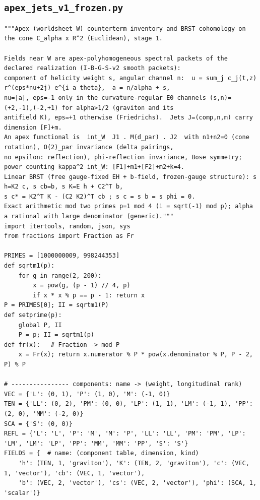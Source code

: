 \documentclass[10pt]{article}
\begin{document}
\subsection{\texttt{apex\_jets\_v1\_frozen.py}}
\begin{lstlisting}
"""Apex (worldsheet W) counterterm inventory and BRST cohomology on the cone C_alpha x R^2 (Euclidean), stage 1.

Fields near W are apex-polyhomogeneous spectral packets of the declared realization (I-B-G-S-v2 smooth packets):
component of helicity weight s, angular channel n:  u = sum_j c_j(t,z) r^(eps*nu+2j) e^{i a theta},  a = n/alpha + s,
nu=|a|, eps=-1 only in the curvature-regular E0 channels (s,n)=(+2,-1),(-2,+1) for alpha>1/2 (graviton and its
antifield K), eps=+1 otherwise (Friedrichs).  Jets J=(comp,n,m) carry dimension [F]+m.
An apex functional is  int_W  J1 . M(d_par) . J2  with n1+n2=0 (cone rotation), O(2)_par invariance (delta pairings,
no epsilon: reflection), phi-reflection invariance, Bose symmetry; power counting kappa^2 int_W: [F1]+m1+[F2]+m2+k=4.
Linear BRST (free gauge-fixed EH + b-field, frozen-gauge structure): s h=K2 c, s cb=b, s K=E h + C2^T b,
s c* = K2^T K - (C2 K2)^T cb ; s c = s b = s phi = 0.
Exact arithmetic mod two primes p=1 mod 4 (i = sqrt(-1) mod p); alpha a rational with large denominator (generic)."""
import itertools, random, json, sys
from fractions import Fraction as Fr

PRIMES = [1000000009, 998244353]
def sqrtm1(p):
    for g in range(2, 200):
        x = pow(g, (p - 1) // 4, p)
        if x * x % p == p - 1: return x
P = PRIMES[0]; II = sqrtm1(P)
def setprime(p):
    global P, II
    P = p; II = sqrtm1(p)
def fr(x):   # Fraction -> mod P
    x = Fr(x); return x.numerator % P * pow(x.denominator % P, P - 2, P) % P

# ---------------- components: name -> (weight, longitudinal rank)
VEC = {'L': (0, 1), 'P': (1, 0), 'M': (-1, 0)}
TEN = {'LL': (0, 2), 'PM': (0, 0), 'LP': (1, 1), 'LM': (-1, 1), 'PP': (2, 0), 'MM': (-2, 0)}
SCA = {'S': (0, 0)}
REFL = {'L': 'L', 'P': 'M', 'M': 'P', 'LL': 'LL', 'PM': 'PM', 'LP': 'LM', 'LM': 'LP', 'PP': 'MM', 'MM': 'PP', 'S': 'S'}
FIELDS = {  # name: (component table, dimension, kind)
    'h': (TEN, 1, 'graviton'), 'K': (TEN, 2, 'graviton'), 'c': (VEC, 1, 'vector'), 'cb': (VEC, 1, 'vector'),
    'b': (VEC, 2, 'vector'), 'cs': (VEC, 2, 'vector'), 'phi': (SCA, 1, 'scalar')}


\end{lstlisting}
\end{document}
